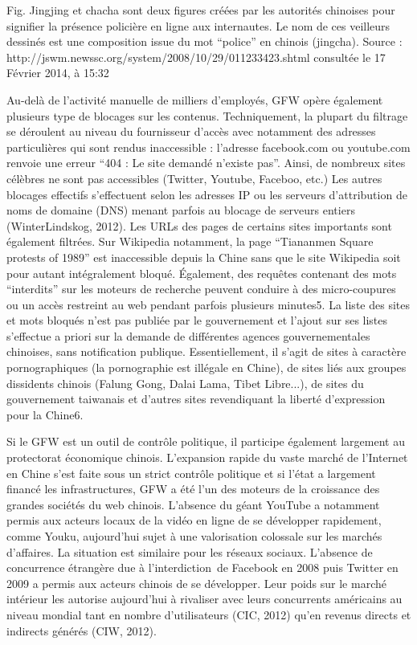Fig. Jingjing et chacha sont deux figures créées par les autorités chinoises pour signifier la présence policière en ligne aux internautes. Le nom de ces veilleurs dessinés est une composition issue du mot “police” en chinois (jingcha). Source : http://jswm.newssc.org/system/2008/10/29/011233423.shtml consultée le 17 Février 2014, à 15:32

Au-delà de l’activité manuelle de milliers d’employés, GFW opère également plusieurs type de blocages sur les contenus. Techniquement, la plupart du filtrage se déroulent au niveau du fournisseur d’accès avec notamment des adresses particulières qui sont rendus inaccessible : l’adresse facebook.com ou youtube.com renvoie une erreur “404 : Le site demandé n’existe pas”. Ainsi, de nombreux sites célèbres ne sont pas accessibles (Twitter, Youtube, Faceboo, etc.) Les autres blocages effectifs s’effectuent selon les adresses IP ou les serveurs d’attribution de noms de domaine (DNS) menant parfois au blocage de serveurs entiers (WinterLindskog, 2012). Les URLs des pages de certains sites importants sont également filtrées. Sur Wikipedia notamment, la page “Tiananmen Square protests of 1989” est inaccessible depuis la Chine sans que le site Wikipedia soit pour autant intégralement bloqué. Également, des requêtes contenant des mots “interdits” sur les moteurs de recherche peuvent conduire à des micro-coupures ou un accès restreint au web pendant parfois plusieurs minutes5. La liste des sites et mots bloqués n’est pas publiée par le gouvernement et l’ajout sur ses listes s’effectue a priori sur la demande de différentes agences gouvernementales chinoises, sans notification publique. Essentiellement, il s’agit de sites à caractère pornographiques (la pornographie est illégale en Chine), de sites liés aux groupes dissidents chinois (Falung Gong, Dalai Lama, Tibet Libre...), de sites du gouvernement taiwanais et d’autres sites revendiquant la liberté d’expression pour la Chine6.

Si le GFW est un outil de contrôle politique, il participe également largement au protectorat économique chinois. L’expansion rapide du vaste marché de l'Internet en Chine s’est faite sous un strict contrôle politique et si l’état a largement financé les infrastructures, GFW a été l’un des moteurs de la croissance des grandes sociétés du web chinois. L'absence du géant YouTube a notamment permis aux acteurs locaux de la vidéo en ligne de se développer rapidement, comme Youku, aujourd’hui sujet à une valorisation colossale sur les marchés d’affaires. La situation est similaire pour les réseaux sociaux. L'absence de concurrence étrangère due à l’interdiction de Facebook en 2008 puis Twitter en 2009 a permis aux acteurs chinois de se développer. Leur poids sur le marché intérieur les autorise aujourd’hui à rivaliser avec leurs concurrents américains au niveau mondial tant en nombre d’utilisateurs (CIC, 2012) qu’en revenus directs et indirects générés (CIW, 2012).

